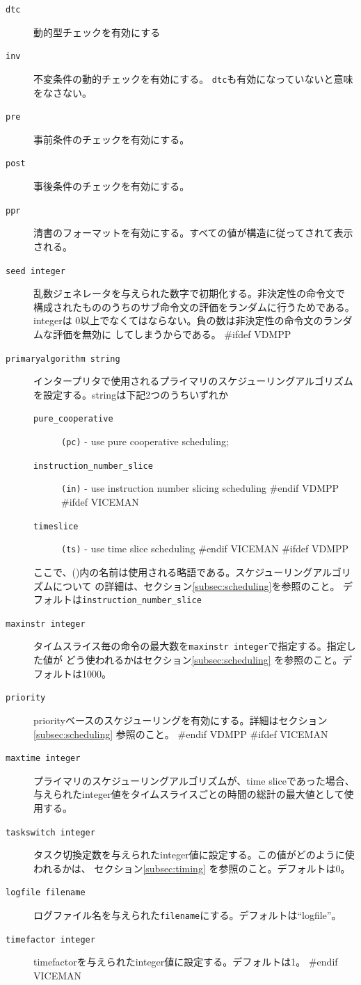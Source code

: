 \documentclass[\pformat,12pt]{article}
\begin{document}
\begin{description}
  \begin{description}
  \item[{\tt dtc}] 動的型チェックを有効にする
  \item[{\tt inv}] 不変条件の動的チェックを有効にする。 {\tt dtc}も有効になっていないと意味をなさない。
  \item[{\tt pre}] 事前条件のチェックを有効にする。
  \item[{\tt post}] 事後条件のチェックを有効にする。
  \item[{\tt ppr}] 清書のフォーマットを有効にする。すべての値が構造に従ってされて表示される。
  \item[{\tt seed integer}]
    乱数ジェネレータを与えられた数字で初期化する。非決定性の命令文で
    構成されたもののうちのサブ命令文の評価をランダムに行うためである。integerは
     0以上でなくてはならない。負の数は非決定性の命令文のランダムな評価を無効に
    してしまうからである。
#ifdef VDMPP
  \item[{\tt primaryalgorithm string}]
    インタープリタで使用されるプライマリのスケジューリングアルゴリズムを設定する。stringは下記2つのうちいずれか
    \begin{description}
    \item[{\tt pure\_cooperative}] \texttt{(pc)} - use pure
      cooperative scheduling;
    \item[{\tt instruction\_number\_slice}] \texttt{(in)} - use
      instruction number slicing scheduling
#endif VDMPP
#ifdef VICEMAN
    \item[{\tt timeslice}] \texttt{(ts)} - use time slice scheduling 
#endif VICEMAN
#ifdef VDMPP
    \end{description}
    ここで、()内の名前は使用される略語である。スケジューリングアルゴリズムについて
    の詳細は、セクション\ref{subsec:scheduling}を参照のこと。
    デフォルトは{\tt instruction\_number\_slice}
  \item[{\tt maxinstr integer}]
    タイムスライス毎の命令の最大数を{\tt maxinstr integer}で指定する。指定した値が
    どう使われるかはセクション\ref{subsec:scheduling} を参照のこと。デフォルトは1000。
  \item[{\tt priority}]
    priorityベースのスケジューリングを有効にする。詳細はセクション\ref{subsec:scheduling} 参照のこと。
#endif VDMPP
#ifdef VICEMAN
  \item[{\tt maxtime integer}]
    プライマリのスケジューリングアルゴリズムが、time sliceであった場合、
    与えられたinteger値をタイムスライスごとの時間の総計の最大値として使用する。
  \item[{\tt taskswitch integer}]
    タスク切換定数を与えられたinteger値に設定する。この値がどのように使われるかは、
    セクション\ref{subsec:timing} を参照のこと。デフォルトは0。
  \item[{\tt logfile filename}]
    ログファイル名を与えられた{\tt filename}にする。デフォルトは``logfile''。
  \item[{\tt timefactor integer}]
    timefactorを与えられたinteger値に設定する。デフォルトは1。
#endif VICEMAN
  \end{description}
  

\end{description}
\end{document}
